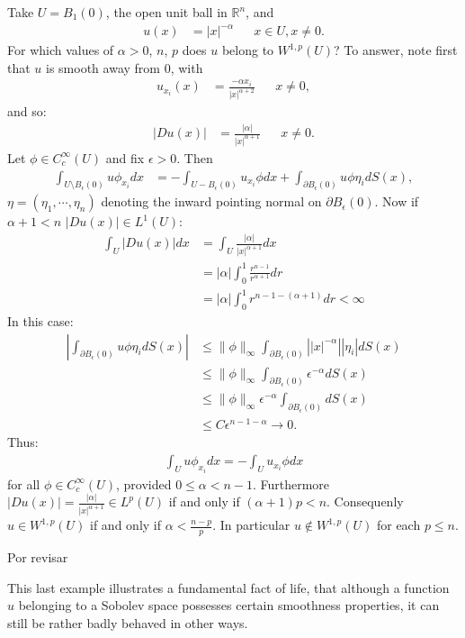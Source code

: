 \begin{example}{}
  Take $U=B_1(0)$, the open unit ball in $\mathbb{R}^{n}$, and
  \begin{align*}
    u(x)&=|x|^{-\alpha} && x\in U, x\neq 0.
  \end{align*}
  For which values of $\alpha>0$, $n$, $p$ does $u$ belong to $W^{1,p}(U)$? To answer, note first that $u$ is smooth away from $0$, with
  \begin{align*}
    u_{x_{i}}(x)&=\frac{-\alpha x_{i}}{|x|^{\alpha+2}} && x\neq 0,
  \end{align*}
  and so:
  \begin{align*}
    |Du(x)|&=\frac{|\alpha|}{|x|^{\alpha+1}} &&x\neq 0.
  \end{align*}
  Let $\phi\in C^{\infty}_{c}(U)$ and fix $\epsilon>0$. Then
  \begin{align*}
    \int_{U\setminus B_{\epsilon}(0)}u\phi_{x_{i}}dx&=-\int_{U-B_{\epsilon}(0)}u_{x_{i}}\phi dx+\int_{\partial B_{\epsilon}(0)}u\phi\eta_{i}dS(x),
  \end{align*}
  $\eta=(\eta_1,\cdots,\eta_n)$ denoting the inward pointing normal on $\partial B_{\epsilon}(0)$. Now if $\alpha+1<n$ $|Du(x)|\in L^{1}(U)$:
  \begin{align*}
    \int_{U}|Du(x)|dx&=\int_{U}\frac{|\alpha|}{|x|^{\alpha+1}}dx\\
    &=|\alpha|\int_{0}^{1}\frac{r^{n-1}}{r^{\alpha+1}}dr\\
    &=|\alpha|\int_{0}^{1}r^{n-1-(\alpha+1)}dr < \infty 
  \end{align*}
  In this case:
  \begin{align*}
    \left| \int_{\partial B_{\epsilon}(0)}u\phi\eta_i dS(x)\right|&\leq \|\phi\|_{\infty}\int_{\partial B_{\epsilon}(0)}\left||x|^{-\alpha}\right||\eta_i|dS(x)\\
    &\leq \|\phi\|_{\infty}\int_{\partial B_{\epsilon}(0)}\epsilon^{-\alpha}dS(x)\\
    &\leq \|\phi\|_{\infty}\epsilon^{-\alpha}\int_{\partial B_{\epsilon}(0)}dS(x)\\
    &\leq C\epsilon^{n-1-\alpha}\to 0.
  \end{align*}
  Thus:
  \begin{align*}
    \int_{U}u\phi_{x_{i}}dx=-\int_{U}u_{x_{i}}\phi dx
  \end{align*}
  for all $\phi\in C^{\infty}_{c}(U)$, provided $0\leq \alpha < n-1$. Furthermore $|Du(x)|=\frac{|\alpha|}{|x|^{\alpha+1}}\in L^{p}(U)$ if and only if $(\alpha+1)p<n$. Consequenly $u\in W^{1,p}(U)$ if and only if $\alpha <\frac{n-p}{p}$. In particular $u \notin W^{1,p}(U)$ for each $p\leq n$. 
\end{example}
\begin{example}{}
  Por revisar
\end{example}
This last example illustrates a fundamental fact of life, that although a function $u$ belonging to a Sobolev space possesses certain smoothness properties, it can still be rather badly behaved in other ways.
